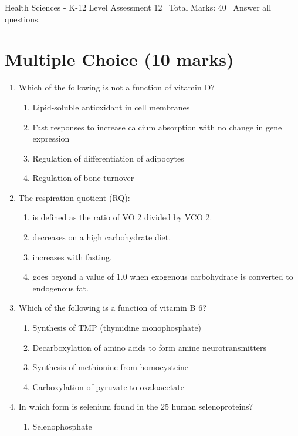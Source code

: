 \documentclass[12pt]{article}
\begin{document}
\begin{center}
Health Sciences - K-12 Level Assessment 12 \
Total Marks: 40 \
Answer all questions.
\end{center}

\section*{Multiple Choice (10 marks)}
\begin{enumerate}[label=\arabic*.]
\item Which of the following is not a function of vitamin D?
\begin{enumerate}[label=(\alph*)]
    \item Lipid-soluble antioxidant in cell membranes
    \item Fast responses to increase calcium absorption with no change in gene expression
    \item Regulation of differentiation of adipocytes
    \item Regulation of bone turnover
\end{enumerate}
\item The respiration quotient (RQ):
\begin{enumerate}[label=(\alph*)]
    \item is defined as the ratio of VO 2 divided by VCO 2.
    \item decreases on a high carbohydrate diet.
    \item increases with fasting.
    \item goes beyond a value of 1.0 when exogenous carbohydrate is converted to endogenous fat.
\end{enumerate}
\item Which of the following is a function of vitamin B 6?
\begin{enumerate}[label=(\alph*)]
    \item Synthesis of TMP (thymidine monophosphate)
    \item Decarboxylation of amino acids to form amine neurotransmitters
    \item Synthesis of methionine from homocysteine
    \item Carboxylation of pyruvate to oxaloacetate
\end{enumerate}
\item In which form is selenium found in the 25 human selenoproteins?
\begin{enumerate}[label=(\alph*)]
    \item Selenophosphate

\end{enumerate}
\end{enumerate}
\end{document}
